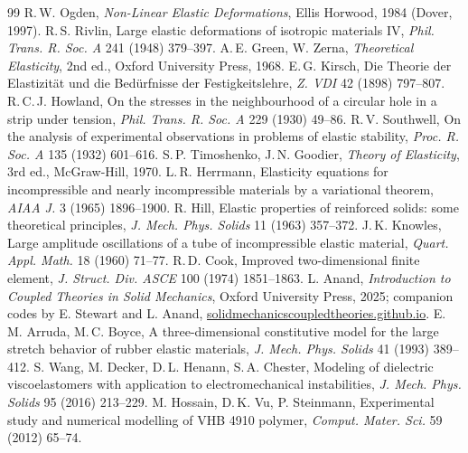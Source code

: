 \documentclass[11pt]{article}
\begin{document}
\small\begin{thebibliography}{99}
 R.\,W. Ogden, \emph{Non-Linear Elastic Deformations}, Ellis Horwood, 1984 (Dover, 1997).
 R.\,S. Rivlin, Large elastic deformations of isotropic materials IV, \emph{Phil. Trans. R. Soc. A} 241 (1948) 379--397.
 A.\,E. Green, W. Zerna, \emph{Theoretical Elasticity}, 2nd ed., Oxford University Press, 1968.
 E.\,G. Kirsch, Die Theorie der Elastizit\"at und die Bed\"urfnisse der Festigkeitslehre, \emph{Z. VDI} 42 (1898) 797--807.
 R.\,C.\,J. Howland, On the stresses in the neighbourhood of a circular hole in a strip under tension, \emph{Phil. Trans. R. Soc. A} 229 (1930) 49--86.
 R.\,V. Southwell, On the analysis of experimental observations in problems of elastic stability, \emph{Proc. R. Soc. A} 135 (1932) 601--616.
 S.\,P. Timoshenko, J.\,N. Goodier, \emph{Theory of Elasticity}, 3rd ed., McGraw-Hill, 1970.
 L.\,R. Herrmann, Elasticity equations for incompressible and nearly incompressible materials by a variational theorem, \emph{AIAA J.} 3 (1965) 1896--1900.
 R. Hill, Elastic properties of reinforced solids: some theoretical principles, \emph{J. Mech. Phys. Solids} 11 (1963) 357--372.
 J.\,K. Knowles, Large amplitude oscillations of a tube of incompressible elastic material, \emph{Quart. Appl. Math.} 18 (1960) 71--77.
 R.\,D. Cook, Improved two-dimensional finite element, \emph{J. Struct. Div. ASCE} 100 (1974) 1851--1863.
 L. Anand, \emph{Introduction to Coupled Theories in Solid Mechanics}, Oxford University Press, 2025; companion codes by E. Stewart and L. Anand, \url{solidmechanicscoupledtheories.github.io}.
 E.\,M. Arruda, M.\,C. Boyce, A three-dimensional constitutive model for the large stretch behavior of rubber elastic materials, \emph{J. Mech. Phys. Solids} 41 (1993) 389--412.
 S. Wang, M. Decker, D.\,L. Henann, S.\,A. Chester, Modeling of dielectric viscoelastomers with application to electromechanical instabilities, \emph{J. Mech. Phys. Solids} 95 (2016) 213--229.
 M. Hossain, D.\,K. Vu, P. Steinmann, Experimental study and numerical modelling of VHB 4910 polymer, \emph{Comput. Mater. Sci.} 59 (2012) 65--74.
\end{thebibliography}
\end{document}
